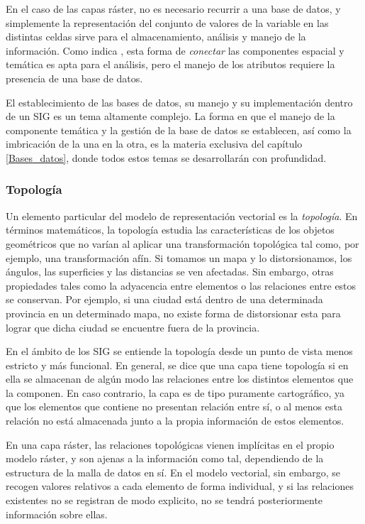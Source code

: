 \begin{multicols}{2}
En el caso de las capas ráster, no es necesario recurrir a una base de datos, y simplemente la representación del conjunto de valores de la variable en las distintas celdas sirve para el almacenamiento, análisis y manejo de la información. Como indica \cite{Heywood1998Longman}, esta forma de \emph{conectar} las componentes espacial y temática es apta para el análisis, pero el manejo de los atributos requiere la presencia de una base de datos.

El establecimiento de las bases de datos, su manejo y su implementación dentro de un SIG es un tema altamente complejo. La forma en que el manejo de la componente temática y la gestión de la base de datos se establecen, así como la imbricación de la una en la otra, es la materia exclusiva del capítulo \ref{Bases_datos}, donde todos estos temas se desarrollarán con profundidad.

\subsubsection{Topología}
\label{Topologia}


Un elemento particular del modelo de representación vectorial es la \emph{topología}. En términos matemáticos, la topología estudia las características de los objetos geométricos que no varían al aplicar una transformación topológica tal como, por ejemplo, una transformación afín. Si tomamos un mapa y lo distorsionamos, los ángulos, las superficies y las distancias se ven afectadas. Sin embargo, otras propiedades tales como la adyacencia entre elementos o las relaciones entre estos se conservan. Por ejemplo, si una ciudad está dentro de una determinada provincia en un determinado mapa, no existe forma de distorsionar esta para lograr que dicha ciudad se encuentre fuera de la provincia.

En el ámbito de los SIG se entiende la topología desde un punto de vista menos estricto y más funcional. En general, se dice que una capa tiene topología si en ella se almacenan de algún modo las relaciones entre los distintos elementos que la componen. En caso contrario, la capa es de tipo puramente cartográfico, ya que los elementos que contiene no presentan relación entre sí, o al menos esta relación no está almacenada junto a la propia información de estos elementos.

En una capa ráster, las relaciones topológicas vienen implícitas en el propio modelo ráster, y son ajenas a la información como tal, dependiendo de la estructura de la malla de datos en sí. En el modelo vectorial, sin embargo, se recogen  valores relativos a cada elemento de forma individual, y si las relaciones existentes no se registran de modo explicito, no se tendrá posteriormente información sobre ellas.


\end{multicols}
